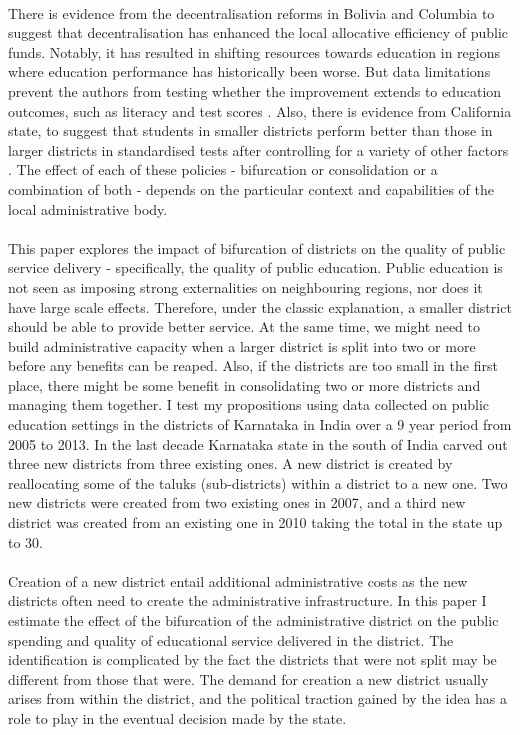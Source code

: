\documentclass[12pt, a4paper]{article}
\begin{document}
\paragraph{} There is evidence from the decentralisation reforms in Bolivia and Columbia to suggest that decentralisation has enhanced the local allocative efficiency of public funds. Notably, it has resulted in shifting resources towards education in regions where education performance has historically been worse. But data limitations prevent the authors from testing whether the improvement extends to education outcomes, such as literacy and test scores \parencite{faguet2008decentralization}. Also, there is evidence from California state, to suggest that students in smaller districts perform better than those in larger districts in standardised tests after controlling for a variety of other factors \parencite{driscoll2003school}. The effect of each of these policies - bifurcation or consolidation or a combination of both - depends on the particular context and capabilities of the local administrative body. 

\paragraph{}This paper explores the impact of bifurcation of districts on the quality of public service delivery - specifically, the quality of public education. Public education is not seen as imposing strong externalities on neighbouring regions, nor does it have large scale effects. Therefore, under the classic explanation, a smaller district should be able to provide better service. At the same time, we might need to build administrative capacity when a larger district is split into two or more before any benefits can be reaped. Also, if the districts are too small in the first place, there might be some benefit in consolidating two or more districts and managing them together. I test my propositions using data collected on public education settings in the districts of Karnataka in India over a 9 year period from 2005 to 2013. In the last decade Karnataka state in the south of India carved out three new districts from three existing ones. A new district is created by reallocating some of the taluks (sub-districts) within a district to a new one. Two new districts were created from two existing ones in 2007, and a third new district was created from an existing one in 2010 taking the total in the state up to 30. 
\paragraph{} Creation of a new district entail additional administrative costs as the new districts often need to create the administrative infrastructure. In this paper I estimate the effect of the bifurcation of the administrative district on the public spending and quality of educational service delivered in the district. The identification is complicated by the fact the districts that were not split may be different from those that were. The demand for creation a new district usually arises from within the district, and the political traction gained by the idea has a role to play in the eventual decision made by the state. 
\end{document}
